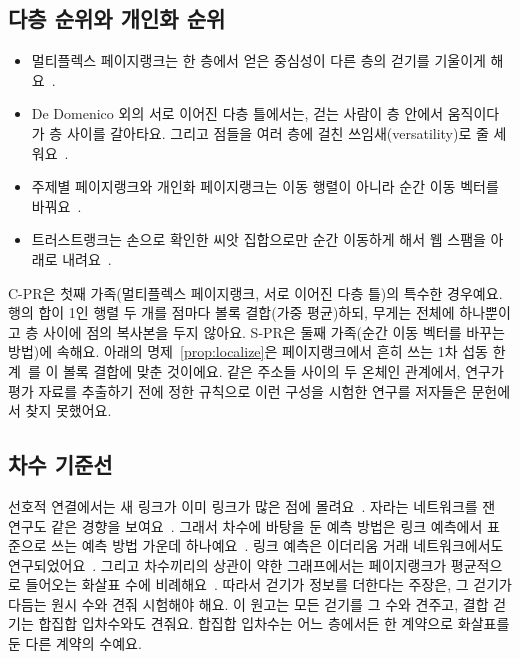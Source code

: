 \subsection{다층 순위와 개인화 순위}

\begin{itemize}
\item 멀티플렉스 페이지랭크는 한 층에서 얻은 중심성이 다른 층의 걷기를 기울이게 해요~\cite{halu2013multiplex}.
\item De Domenico 외의 서로 이어진 다층 틀에서는, 걷는 사람이 층 안에서 움직이다가 층 사이를 갈아타요. 그리고 점들을 여러 층에 걸친 쓰임새(versatility)로 줄 세워요~\cite{dedomenico2015ranking}.
\item 주제별 페이지랭크와 개인화 페이지랭크는 이동 행렬이 아니라 순간 이동 벡터를 바꿔요~\cite{haveliwala2003topic,jeh2003personalized}.
\item 트러스트랭크는 손으로 확인한 씨앗 집합으로만 순간 이동하게 해서 웹 스팸을 아래로 내려요~\cite{gyongyi2004trustrank}.
\end{itemize}
C-PR은 첫째 가족(멀티플렉스 페이지랭크, 서로 이어진 다층 틀)의 특수한 경우예요. 행의 합이 1인 행렬 두 개를 점마다 볼록 결합(가중 평균)하되, 무게는 전체에 하나뿐이고 층 사이에 점의 복사본을 두지 않아요. S-PR은 둘째 가족(순간 이동 벡터를 바꾸는 방법)에 속해요. 아래의 명제~\ref{prop:localize}은 페이지랭크에서 흔히 쓰는 1차 섭동 한계~\cite{langville2006pagerank}를 이 볼록 결합에 맞춘 것이에요. 같은 주소들 사이의 두 온체인 관계에서, 연구가 평가 자료를 추출하기 전에 정한 규칙으로 이런 구성을 시험한 연구를 저자들은 문헌에서 찾지 못했어요.

\subsection{차수 기준선}

선호적 연결에서는 새 링크가 이미 링크가 많은 점에 몰려요~\cite{barabasi1999scaling}. 자라는 네트워크를 잰 연구도 같은 경향을 보여요~\cite{newman2001clustering}. 그래서 차수에 바탕을 둔 예측 방법은 링크 예측에서 표준으로 쓰는 예측 방법 가운데 하나예요~\cite{libennowell2007link}. 링크 예측은 이더리움 거래 네트워크에서도 연구되었어요~\cite{lin2022tracking}. 그리고 차수끼리의 상관이 약한 그래프에서는 페이지랭크가 평균적으로 들어오는 화살표 수에 비례해요~\cite{fortunato2008indegree}. 따라서 걷기가 정보를 더한다는 주장은, 그 걷기가 다듬는 원시 수와 견줘 시험해야 해요. 이 원고는 모든 걷기를 그 수와 견주고, 결합 걷기는 합집합 입차수와도 견줘요. 합집합 입차수는 어느 층에서든 한 계약으로 화살표를 둔 다른 계약의 수예요.


